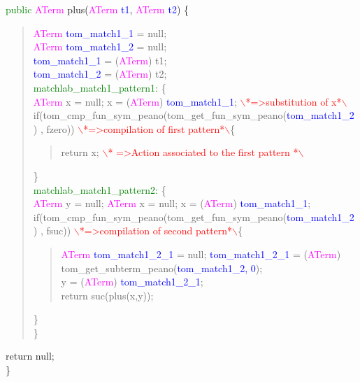 \textcolor{green}{public} \textcolor{magenta}{ATerm} plus(\textcolor{magenta}{ATerm} \textcolor{blue}{t1}, \textcolor{magenta}{ATerm} \textcolor{blue}{t2}) \{\\
\begin{quote}
  \textcolor{magenta}{ATerm} \textcolor{blue}{tom\_match1\_1} = null; \\
  \textcolor{magenta}{ATerm} \textcolor{blue}{tom\_match1\_2} = null; \\
  \textcolor{blue}{tom\_match1\_1} = (\textcolor{magenta}{ATerm}) t1; \\
  \textcolor{blue}{tom\_match1\_2} = (\textcolor{magenta}{ATerm}) t2; \\
  \textcolor{green}{matchlab\_match1\_pattern1:} \{\\ 
  \textcolor{magenta}{ATerm} x = null; x =
  (\textcolor{magenta}{ATerm}) \textcolor{blue}{tom\_match1\_1};
  \textcolor{red}{$\backslash$*=>substitution of x*$\backslash$}\\
  if(tom\_cmp\_fun\_sym\_peano(tom\_get\_fun\_sym\_peano(\textcolor{blue}{tom\_match1\_2}) ,
  fzero)) \textcolor{red}{$\backslash$*=>compilation of first pattern*$\backslash$}\{\\
  \begin{quote}
    return x;  \textcolor{red}{$\backslash$* =>Action associated to the
      first pattern *$\backslash$}
  \end{quote}
  \}\\
  \textcolor{green}{matchlab\_match1\_pattern2:} \{\\ 
  \textcolor{magenta}{ATerm} y = null; \textcolor{magenta}{ATerm} x = null; 
  x = (\textcolor{magenta}{ATerm}) \textcolor{blue}{tom\_match1\_1}; \\
  if(tom\_cmp\_fun\_sym\_peano(tom\_get\_fun\_sym\_peano(\textcolor{blue}{tom\_match1\_2}) ,
  fsuc)) \textcolor{red}{$\backslash$*=>compilation of second pattern*$\backslash$}\{\\
  \begin{quote}
    \textcolor{magenta}{ATerm} \textcolor{blue}{tom\_match1\_2\_1} = null; \textcolor{blue}{tom\_match1\_2\_1} = (\textcolor{magenta}{ATerm})
    tom\_get\_subterm\_peano(\textcolor{blue}{tom\_match1\_2, 0}); \\ 
    y = (\textcolor{magenta}{ATerm}) \textcolor{blue}{tom\_match1\_2\_1};\\
    return suc(plus(x,y));\\
  \end{quote}
  \}\\
  \}\\
\end{quote}
return null;\\
\}\\


